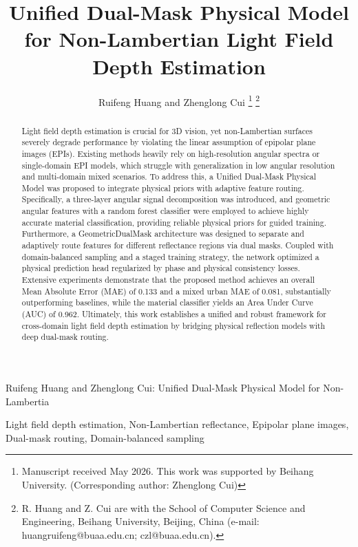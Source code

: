 \documentclass[lettersize,journal]{IEEEtran}
\begin{document}
\title{Unified Dual-Mask Physical Model for Non-Lambertian Light Field Depth Estimation}

\author{Ruifeng Huang and Zhenglong Cui
\thanks{Manuscript received May 2026. This work was supported by Beihang University. (Corresponding author: Zhenglong Cui)}
\thanks{R. Huang and Z. Cui are with the School of Computer Science and Engineering, Beihang University, Beijing, China (e-mail: huangruifeng@buaa.edu.cn; czl@buaa.edu.cn).}}

%
{Ruifeng Huang and Zhenglong Cui: Unified Dual-Mask Physical Model for Non-Lambertia}

\maketitle

\begin{abstract}
Light field depth estimation is crucial for 3D vision, yet non-Lambertian surfaces severely degrade performance by violating the linear assumption of epipolar plane images (EPIs). Existing methods heavily rely on high-resolution angular spectra or single-domain EPI models, which struggle with generalization in low angular resolution and multi-domain mixed scenarios. To address this, a Unified Dual-Mask Physical Model was proposed to integrate physical priors with adaptive feature routing. Specifically, a three-layer angular signal decomposition was introduced, and geometric angular features with a random forest classifier were employed to achieve highly accurate material classification, providing reliable physical priors for guided training. Furthermore, a GeometricDualMask architecture was designed to separate and adaptively route features for different reflectance regions via dual masks. Coupled with domain-balanced sampling and a staged training strategy, the network optimized a physical prediction head regularized by phase and physical consistency losses. Extensive experiments demonstrate that the proposed method achieves an overall Mean Absolute Error (MAE) of 0.133 and a mixed urban MAE of 0.081, substantially outperforming baselines, while the material classifier yields an Area Under Curve (AUC) of 0.962. Ultimately, this work establishes a unified and robust framework for cross-domain light field depth estimation by bridging physical reflection models with deep dual-mask routing.
\end{abstract}

\begin{IEEEkeywords}
Light field depth estimation, Non-Lambertian reflectance, Epipolar plane images, Dual-mask routing, Domain-balanced sampling
\end{IEEEkeywords}
\end{document}
